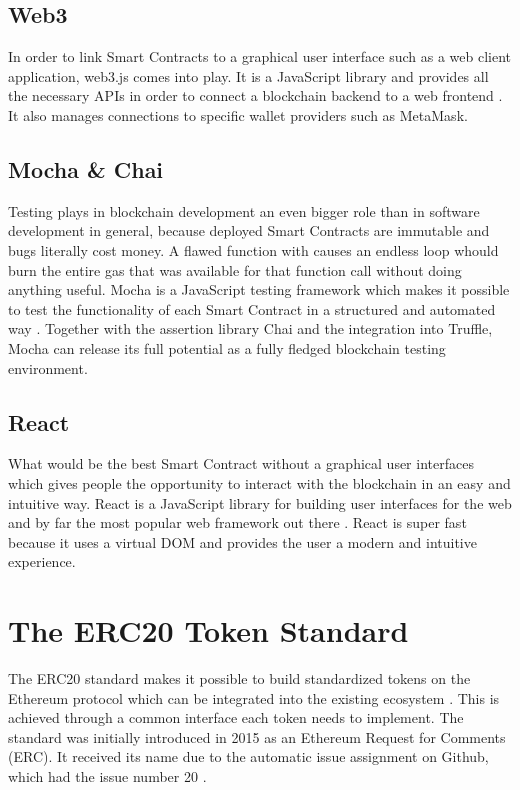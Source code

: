 \subsection{Web3}
In order to link Smart Contracts to a graphical user interface such as a web client application, web3.js comes into play. It is a JavaScript library and provides all the necessary APIs in order to connect a blockchain backend to a web frontend \cite{Web3}. It also manages connections to specific wallet providers such as MetaMask.

\subsection{Mocha \& Chai}
Testing plays in blockchain development an even bigger role than in software development in general, because deployed Smart Contracts are immutable and bugs literally cost money. A flawed function with causes an endless loop whould burn the entire gas that was available for that function call without doing anything useful. Mocha is a JavaScript testing framework which makes it possible to test the functionality of each Smart Contract in a structured and automated way \cite{Mocha}. Together with the assertion library Chai \cite{Chai} and the integration into Truffle, Mocha can release its full potential as a fully fledged blockchain testing environment.

\subsection{React}
What would be the best Smart Contract without a graphical user interfaces which gives people the opportunity to interact with the blockchain in an easy and intuitive way. React is a JavaScript library for building user interfaces for the web and by far the most popular web framework out there \cite{React}. React is super fast because it uses a virtual DOM and provides the user a modern and intuitive experience.

\section{The ERC20 Token Standard}
The ERC20 standard makes it possible to build standardized tokens on the Ethereum protocol which can be integrated into the existing ecosystem \cite{ERC20}. This is achieved through a common interface each token needs to implement. The standard was initially introduced in 2015 as an Ethereum Request for Comments (ERC). It received its name due to the automatic issue assignment on Github, which had the issue number 20 \cite{AntonopoulosWood2018}.

